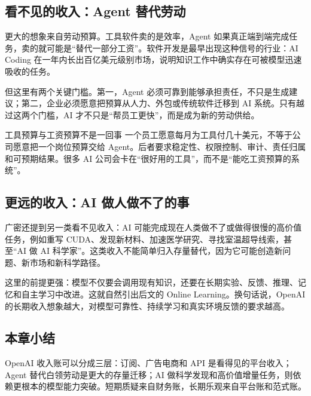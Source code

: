 \subsection{看不见的收入：Agent 替代劳动}

更大的想象来自劳动预算。工具软件卖的是效率，Agent 如果真正端到端完成任务，卖的就可能是“替代一部分工资”。软件开发是最早出现这种信号的行业：AI Coding 在一年内长出百亿美元级别市场，说明知识工作中确实存在可被模型迅速吸收的任务。

但这里有两个关键门槛。第一，Agent 必须可靠到能够承担责任，不只是生成建议；第二，企业必须愿意把预算从人力、外包或传统软件迁移到 AI 系统。只有越过这两个门槛，AI 才不只是“帮员工更快”，而是成为新的劳动供给。

\begin{warningbox}{工具预算与工资预算不是一回事}
一个员工愿意每月为工具付几十美元，不等于公司愿意把一个岗位预算交给 Agent。后者要求稳定性、权限控制、审计、责任归属和可预期结果。很多 AI 公司会卡在“很好用的工具”，而不是“能吃工资预算的系统”。
\end{warningbox}

\subsection{更远的收入：AI 做人做不了的事}

广密还提到另一类看不见收入：AI 可能完成现在人类做不了或做得很慢的高价值任务，例如重写 CUDA、发现新材料、加速医学研究、寻找室温超导线索，甚至“AI 做 AI 科学家”。这类收入不能简单归入存量替代，因为它可能创造新问题、新市场和新科学路径。

这里的前提更强：模型不仅要会调用现有知识，还要在长期实验、反馈、推理、记忆和自主学习中改进。这就自然引出后文的 Online Learning。换句话说，OpenAI 的长期收入想象越大，对模型可靠性、持续学习和真实环境反馈的要求越高。

\subsection{本章小结}

OpenAI 收入账可以分成三层：订阅、广告电商和 API 是看得见的平台收入；Agent 替代白领劳动是更大的存量迁移；AI 做科学发现和高价值增量任务，则依赖更根本的模型能力突破。短期质疑来自财务账，长期乐观来自平台账和范式账。

